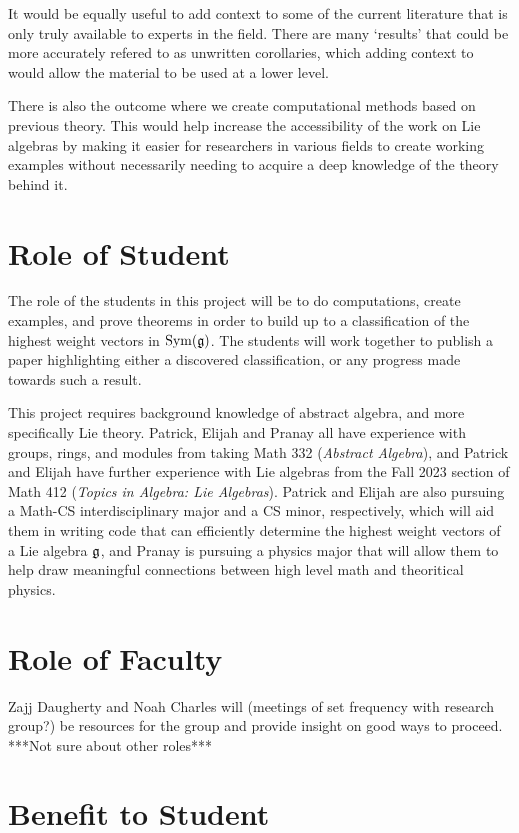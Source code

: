 \documentclass[11pt, reqno]{amsart}
\begin{document}
It would be equally useful to add context to some of the current literature that is only truly available to experts in the field. There are many `results' that could be more accurately refered to as unwritten corollaries, which adding context to would allow the material to be used at a lower level.

There is also the outcome where we create computational methods based on previous theory. This would help increase the accessibility of the work on Lie algebras by making it easier for researchers in various fields to create working examples without necessarily needing to acquire a deep knowledge of the theory behind it.





\section{Role of Student}

The role of the students in this project will be to do computations, create examples, and prove theorems in order to build up to a classification of the highest weight vectors in $\operatorname{Sym}(\mathfrak{g})$. The students will work together to publish a paper highlighting either a discovered classification, or any progress made towards such a result. 

This project requires background knowledge of abstract algebra, and more specifically Lie theory. Patrick, Elijah and Pranay all have experience with groups, rings, and modules from taking Math 332 (\emph{Abstract Algebra}), and Patrick and Elijah have further experience with Lie algebras from the Fall 2023 section of Math 412 (\emph{Topics in Algebra: Lie Algebras}). Patrick and Elijah are also pursuing a Math-CS interdisciplinary major and a CS minor, respectively, which will aid them in writing code that can efficiently determine the highest weight vectors of a Lie algebra $\mathfrak{g}$, and Pranay is pursuing a physics major that will allow them to help draw meaningful connections between high level math and theoritical physics.


\section{Role of Faculty}

Zajj Daugherty and Noah Charles will (meetings of set frequency with research group?) be resources for the group and provide insight on good ways to proceed. ***Not sure about other roles***

\section{Benefit to Student}


\printbibliography
\end{document}
